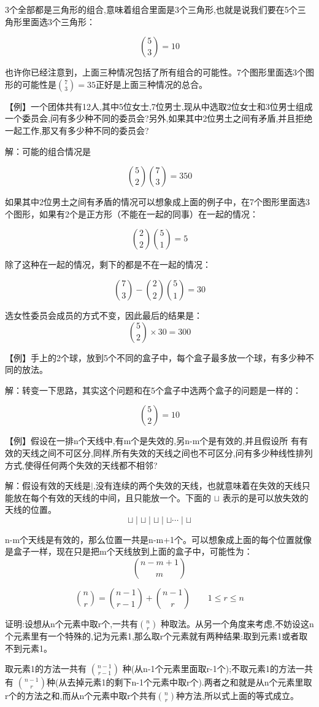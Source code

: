 3个全部都是三角形的组合,意味着组合里面是3个三角形,也就是说我们要在5个三角形里面选3个三角形：

$$
	{5 \choose 3} = 10
$$

也许你已经注意到，上面三种情况包括了所有组合的可能性。7个图形里面选3个图形的可能性是$\displaystyle {7 \choose 3} = 35 $正好是上面三种情况的总合。

【例】一个团体共有12人,其中5位女士,7位男士,现从中选取2位女士和3位男士组成一个委员会,问有多少种不同的委员会?另外,如果其中2位男土之间有矛盾,并且拒绝一起工作,那又有多少种不同的委员会?

解：可能的组合情况是

$$
{5 \choose 2}{7 \choose 3} = 350
$$

如果其中2位男土之间有矛盾的情况可以想象成上面的例子中，在7个图形里面选3个图形，如果有2个是正方形（不能在一起的同事）在一起的情况：

$$
	{2 \choose 2}{5 \choose 1} = 5
$$

除了这种在一起的情况，剩下的都是不在一起的情况：

$$
	{7 \choose 3}-{2 \choose 2}{5 \choose 1} = 30
$$

选女性委员会成员的方式不变，因此最后的结果是：
$$
{5 \choose 2}  \times 30 = 300
$$

【例】手上的2个球，放到5个不同的盒子中，每个盒子最多放一个球，有多少种不同的放法。

解：转变一下思路，其实这个问题和在5个盒子中选两个盒子的问题是一样的：

$$
{5 \choose 2} = 10
$$

【例】假设在一排n个天线中,有m个是失效的,另n-m个是有效的,并且假设所
有有效的天线之间不可区分,同样,所有失效的天线之间也不可区分,问有多少种线性排列方式,使得任何两个失效的天线都不相邻?

解：假设有效的天线是$\mid$,没有连续的两个失效的天线，也就意味着在失效的天线只能放在每个有效的天线的中间，且只能放一个。下面的 $\sqcup$ 表示的是可以放失效的天线的位置。
$$
	\sqcup \mid \sqcup \mid \sqcup  \mid \sqcup  \cdots \mid \sqcup 
$$

n-m个天线是有效的，那么位置一共是n-m+1个。可以想象成上面的每个位置就像是盒子一样，现在只是把m个天线放到上面的盒子中，可能性为：
$$
{n-m+1 \choose m} 
$$

\begin{tcolorbox}[title = {常用组合恒等式}]{\indent}

$$
{n \choose r} = {n-1 \choose r-1}  + {n-1 \choose r} \qquad 1 \leqslant r \leqslant n
$$

\qquad 证明:设想从n个元素中取r个,一共有${n \choose r}  $ 种取法。从另一个角度来考虑,不妨设这n个元素里有一个特殊的,记为元素1,那么取r个元素就有两种结果:取到元素1或者取不到元素1。

\qquad 取元素1的方法一共有 ${n-1 \choose r-1} $ 种(从n-1个元素里面取r-1个);不取元素1的方法一共有 ${n-1 \choose r } $种(从去掉元素1的剩下n-1个元素中取r个).两者之和就是从n个元素里取r个的方法之和,而从n个元素中取r个共有$ {n \choose r} $种方法,所以式上面的等式成立。
\end{tcolorbox}	

